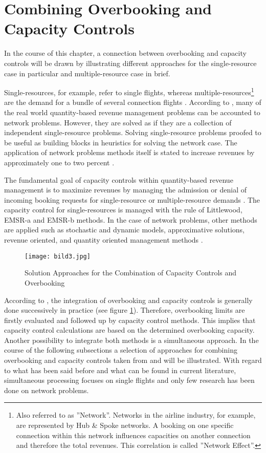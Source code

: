 \newpage
\section{Combining Overbooking and Capacity Controls}
\label{3.3}
In the course of this chapter, a connection between overbooking and capacity controls will be drawn by illustrating different approaches for the single-resource case in particular and multiple-resource case in brief. 

Single-resources, for example, refer to single flights, whereas multiple-resources\footnote{Also referred to as ''Network''. Networks in the airline industry, for example, are represented by Hub \& Spoke networks. A booking on one specific connection within this network influences capacities on another connection and therefore the total revenues. This correlation is called ''Network Effect''.\cite[p.93]{klein2008}} are the demand for a bundle of several connection flights \cite[p.149]{informs}. According to \citet[p.149]{informs}, many of the real world quantity-based revenue management problems can be accounted to network problems. However, they are solved as if they are a collection of independent single-resource problems. Solving single-resource problems proofed to be useful as building blocks in heuristics for solving the network case. The application of network problems methods itself is stated to increase revenues by approximately one to two percent \cite[p.1367]{boyd2003}.

The fundamental goal of capacity controls within quantity-based revenue management is to maximize revenues by managing the admission or denial of incoming booking requests for single-resource or multiple-resource demands \cite[p.27]{talluri2004}. The capacity control for single-resources is managed with the rule of Littlewood, EMSR-a and EMSR-b methods. In the case of network problems, other methods are applied such as stochastic and dynamic models, approximative solutions, revenue oriented, and quantity oriented management methods \cite{klein2008}.
\begin{figure}[htbp] 
	\centering 
	\label{fig:34}
	\texttt{[image: bild3.jpg]}
	\caption{Solution Approaches for the Combination of Capacity Controls and Overbooking}
\end{figure}
According to \citet[pp.160-161]{klein2008}, the integration of overbooking and capacity controls is generally done successively in practice (see figure \ref{fig:34}). Therefore, overbooking limits are firstly evaluated and followed up by capacity control methods. This implies that capacity control calculations are based on the determined overbooking capacity. Another possibility to integrate both methods is a simultaneous approach. In the course of the following subsections a selection of approaches for combining overbooking and capacity controls taken from \citet{klein2008} and \citet{talluri2004} will be illustrated. With regard to what has been said before and what can be found in current literature, simultaneous processing focuses on single flights and only few research has been done on network problems.

